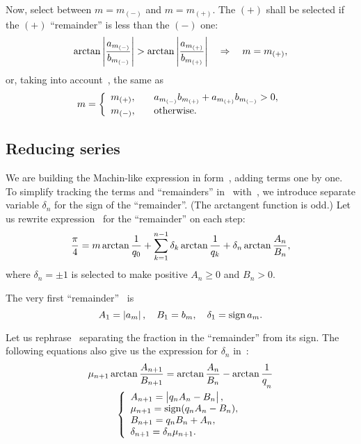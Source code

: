 \documentclass[draft, 10pt]{article} %
\begin{document}
Now, select between $m = m_{(-)}$ and $m = m_{(+)}$. The $(+)$ shall be
selected if the $(+)$ ``remainder'' is less than the $(-)$ one:
$$
\arctan\left| \displaystyle\frac{a_{m_{(-)}}}{b_{m_{(-)}}} \right| >
    \arctan\left| \displaystyle\frac{a_{m_{(+)}}}{b_{m_{(+)}}} \right|
\quad\Rightarrow\quad m = m_{(+)},
$$
or, taking into account~, the same as
%
\begin{equation}\mlabel{m-zero}
m = \left\{
\begin{array}{ll}
m_{(+)}, \quad & a_{m_{(-)}} b_{m_{(+)}} + a_{m_{(+)}} b_{m_{(-)}} > 0, \\[0.2em]
m_{(-)}, & \hbox{otherwise.}
\end{array}
\right.
\end{equation}

\subsection{Reducing series}

We are building the Machin-like expression in form~, adding
terms one by one.
To simplify tracking the terms and ``remainders'' in~
with~, we introduce separate variable $\delta_n$ for the sign of the ``remainder''.
(The arctangent function is odd.)
Let us rewrite expression~ for the ``remainder''
on each step:
%
\begin{equation}\mlabel{remainder-delta}
\dfrac{\pi}{4} = m \arctan\dfrac{1}{q_0}
    + \sum_{k=1}^{n-1} \delta_k \arctan\dfrac{1}{q_k}
    + \delta_n \arctan\dfrac{A_n}{B_n},
\end{equation}
where $\delta_n = \pm 1$ is selected to make positive $A_n \ge 0$ and $B_n > 0$.

The very first ``remainder''~ is
%
\begin{equation}\mlabel{remainder-first}
A_1 = \absolute{a_m}, \quad
B_1 = b_m, \quad
\delta_1 = \sign a_m.
\end{equation}

Let us rephrase~ separating the fraction in the ``remainder'' from its sign.
The following equations also give us the expression for $\delta_n$ in~:
%
\begin{equation}\mlabel{evolve-signed}
\begin{array}{c}
\mu_{n+1} \arctan\dfrac{A_{n+1}}{B_{n+1}} =
    \arctan\dfrac{A_n}{B_n} - \arctan\dfrac{1}{q_{n \strut}} \\
\left\{\begin{array}{l}
A_{n+1} = \absolute{q_n A_n - B_n \strut}, \\
\mu_{n+1} = \sign (q_n A_n - B_n), \\
B_{n+1} = q_n B_n + A_n, \\
\delta_{n+1} = \delta_n \mu_{n+1}.
\end{array}\right.
\end{array}
\end{equation}
\end{document}
